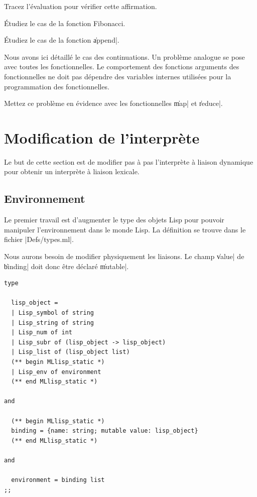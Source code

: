 \documentclass{../../LaTeX/tdsimple}
\begin{document}
\begin{question}
  Tracez l'évaluation pour vérifier cette affirmation.
\end{question}

\begin{question}
  Étudiez le cas de la fonction Fibonacci.
\end{question}

\begin{question}
  Étudiez le cas de la fonction \|append|.
\end{question}

\begin{question}
  Nous avons ici détaillé le cas des continuations. Un problème
  analogue se pose avec toutes les fonctionnelles. Le comportement des
  fonctions arguments des fonctionnelles ne doit pas dépendre des
  variables internes utilisées pour la programmation des
  fonctionnelles.

  Mettez ce problème en évidence avec les fonctionnelles \|map| et
  \|reduce|.
\end{question}

\section{Modification de l'interprète}

Le but de cette section est de modifier pas à pas l'interprète à
liaison dynamique pour obtenir un interprète à liaison lexicale.

\subsection{Environnement}

Le premier travail est d'augmenter le type des objets Lisp pour
pouvoir manipuler l'environnement dans le monde Lisp. La définition se
trouve dans le fichier \file|Defs/types.ml|.
\begin{attention}
  Nous aurons besoin de modifier physiquement les liaisons. Le champ
  \|value| de \|binding| doit donc être déclaré \|mutable|.
\end{attention}

\begin{lstlisting}[language=caml]
type

  lisp_object =
  | Lisp_symbol of string
  | Lisp_string of string
  | Lisp_num of int
  | Lisp_subr of (lisp_object -> lisp_object)
  | Lisp_list of (lisp_object list)
  (** begin MLlisp_static *)
  | Lisp_env of environment
  (** end MLlisp_static *)

and

  (** begin MLlisp_static *)
  binding = {name: string; mutable value: lisp_object}
  (** end MLlisp_static *)

and

  environment = binding list
;;
\end{lstlisting}
\end{document}
